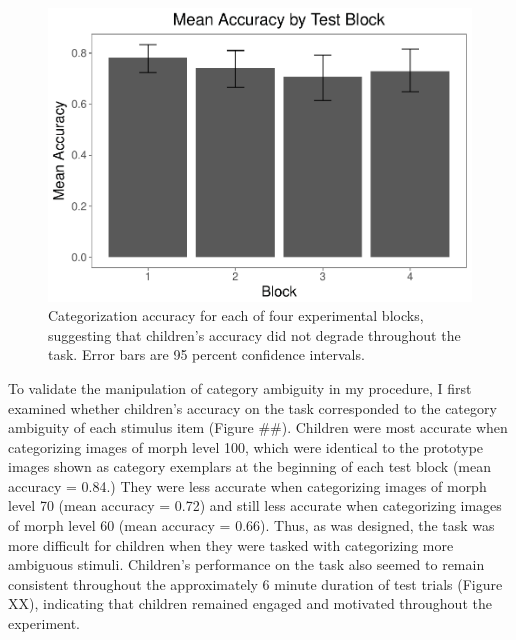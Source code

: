 \documentclass[man]{apa6}
\theoremstyle{definition}
\theoremstyle{definition}
\theoremstyle{definition}
\theoremstyle{remark}
\begin{document}
\begin{figure}
\centering
\includegraphics{soc_ref_category_paper_files/figure-latex/unnamed-chunk-7-1.pdf}
\caption{\label{fig:unnamed-chunk-7}Categorization accuracy for each of four
experimental blocks, suggesting that children's accuracy did not degrade
throughout the task. Error bars are 95 percent confidence intervals.}
\end{figure}

To validate the manipulation of category ambiguity in my procedure, I
first examined whether children's accuracy on the task corresponded to
the category ambiguity of each stimulus item (Figure \#\#). Children
were most accurate when categorizing images of morph level 100, which
were identical to the prototype images shown as category exemplars at
the beginning of each test block (mean accuracy = 0.84.) They were less
accurate when categorizing images of morph level 70 (mean accuracy =
0.72) and still less accurate when categorizing images of morph level 60
(mean accuracy = 0.66). Thus, as was designed, the task was more
difficult for children when they were tasked with categorizing more
ambiguous stimuli. Children's performance on the task also seemed to
remain consistent throughout the approximately 6 minute duration of test
trials (Figure XX), indicating that children remained engaged and
motivated throughout the experiment.
\end{document}
